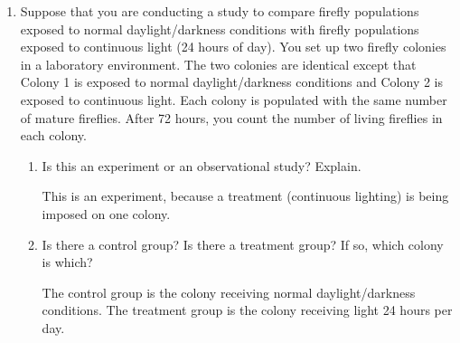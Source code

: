 \documentclass{article}
\newcommand{\answer}[1]{\color{red}#1}
\begin{document}
\begin{enumerate}
\begin{enumerate}
	{\answer The variable is the rating of applicability.  This is a qualitative variable with an ordinal level of measurement, because the is a natural ordering of ``least" to ``most".}
	\vfill
	
	\item Is the proportion of responses ``3 = very" to the second question a statistic or a parameter?  Explain. 
	
	{\answer This proportion is a statistic, because it describing just a sample, rather than the entire population.}
	\vfill
	
	\item Would it be appropriate to generalize the results of your study to all work-study students in the nation?  Explain. 
	
	{\answer Because the sample frame is restricted to just one campus, it would not be appropriate to generalize these results to all work-study students in the nation.}
	\vspace{1cm}
	
	\end{enumerate}
		
\newpage


\item Suppose that you are conducting a study to compare firefly populations exposed to normal daylight/darkness conditions with firefly populations exposed to continuous light (24 hours of day).  You set up two firefly colonies in a laboratory environment.  The two colonies are identical except that Colony 1 is exposed to normal daylight/darkness conditions and Colony 2 is exposed to continuous light.  Each colony is populated with the same number of mature fireflies.  After 72 hours, you count the number of living fireflies in each colony. 

	\begin{enumerate}
	
	\item Is this an experiment or an observational study?  Explain. 
	
	{\answer This is an experiment, because a treatment (continuous lighting) is being imposed on one colony.}
	\vfill
	
	\item Is there a control group?  Is there a treatment group?  If so, which colony is which? 
	
	{\answer The control group is the colony receiving normal daylight/darkness conditions.  The treatment group is the colony receiving light 24 hours per day.}
	\vfill
	

\end{enumerate}
\end{enumerate}
\end{document}
